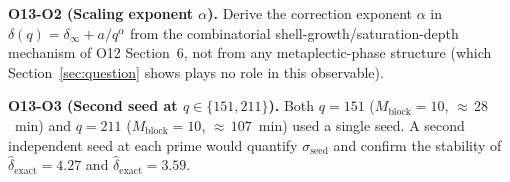 \documentclass[11pt,a4paper]{article}
\theoremstyle{plain}
\theoremstyle{definition}
\newcommand{\dhat}{\hat\delta_{\mathrm{exact}}}
\begin{document}
    \textbf{O13-O2 (Scaling exponent $\alpha$).}
    Derive the correction exponent $\alpha$ in $\delta(q) = \delta_\infty +
    a/q^\alpha$ from the combinatorial shell-growth/saturation-depth mechanism
    of O12 Section~6, not from any metaplectic-phase structure (which
    Section~\ref{sec:question} shows plays no role in this observable).

    \textbf{O13-O3 (Second seed at $q \in \{151, 211\}$).}
    Both $q = 151$ ($M_{\mathrm{block}} = 10$, ${\approx}\,28$~min) and
    $q = 211$ ($M_{\mathrm{block}} = 10$, ${\approx}\,107$~min) used a single
    seed.
    A second independent seed at each prime would quantify $\sigma_{\mathrm{seed}}$
    and confirm the stability of $\dhat = 4.27$ and $\dhat = 3.59$.

    
      
\end{document}
